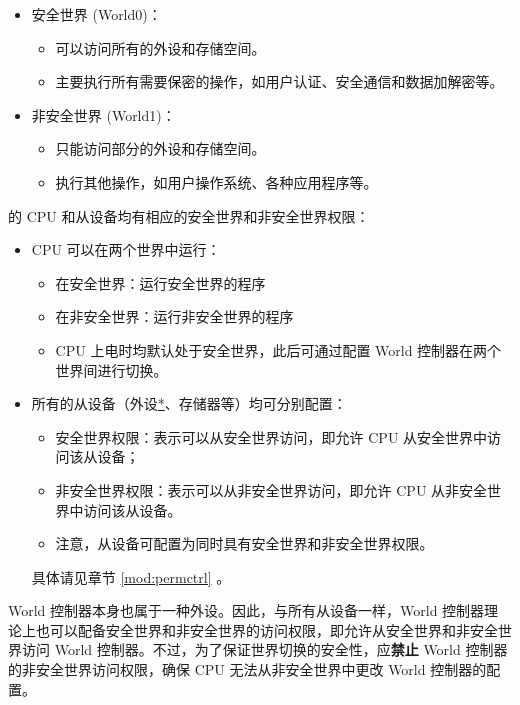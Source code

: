 \documentclass[main\_\_CN.tex]{subfiles}
\begin{document}
\begin{itemize}
    \item 安全世界 (World0)：
    \begin{itemize}
        \item 可以访问所有的外设和存储空间。
        \item 主要执行所有需要保密的操作，如用户认证、安全通信和数据加解密等。
    \end{itemize}
    \item 非安全世界 (World1)：
    \begin{itemize}
        \item 只能访问部分的外设和存储空间。
        \item 执行其他操作，如用户操作系统、各种应用程序等。
    \end{itemize}
\end{itemize}


\chipname{} 的 CPU 和从设备均有相应的安全世界和非安全世界权限：
\begin{itemize}
    \item CPU 可以在两个世界中运行：
        \begin{itemize}
            \item 在安全世界：运行安全世界的程序
            \item 在非安全世界：运行非安全世界的程序
            \item CPU 上电时均默认处于安全世界，此后可通过配置 World 控制器在两个世界间进行切换。
        \end{itemize}
    \item 所有的从设备（外设\hyperref[note:wctrl-access]{*}、存储器等）均可分别配置：
        \begin{itemize}
            \item 安全世界权限：表示可以从安全世界访问，即允许 CPU 从安全世界中访问该从设备；
            \item 非安全世界权限：表示可以从非安全世界访问，即允许 CPU 从非安全世界中访问该从设备。
            \item 注意，从设备可配置为同时具有安全世界和非安全世界权限。
        \end{itemize}
        具体请见章节 \ref{mod:permctrl} \textit{}。
\end{itemize}

\begin{tiplisting}\label{note:wctrl-access}
World 控制器本身也属于一种外设。因此，与所有从设备一样，World 控制器理论上也可以配备安全世界和非安全世界的访问权限，即允许从安全世界和非安全世界访问 World 控制器。不过，为了保证世界切换的安全性，应\textbf{禁止} World 控制器的非安全世界访问权限，确保 CPU 无法从非安全世界中更改 World 控制器的配置。
\end{tiplisting}
\end{document}
